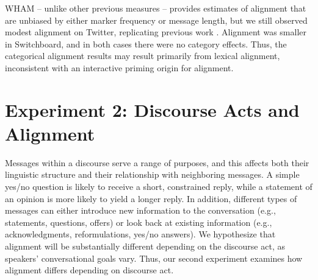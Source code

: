 \documentclass[11pt]{article}
\begin{document}
WHAM -- unlike other previous measures -- provides estimates of alignment that are unbiased by either marker frequency or message length, but we still observed modest alignment on Twitter, replicating previous work \cite{DoyleYurovskyFrank2016,DNMGamonDumais2011}. Alignment was smaller in Switchboard, and in both cases there were no category effects. Thus, the categorical alignment results may result primarily from lexical alignment, inconsistent with an interactive priming origin for alignment.



\section{Experiment 2: Discourse Acts and Alignment}

Messages within a discourse serve a range of purposes, and this affects both their linguistic structure and their relationship with neighboring messages.  A simple yes/no question is likely to receive a short, constrained reply, while a statement of an opinion is more likely to yield a longer reply. In addition, different types of messages can either introduce new information to the conversation (e.g., statements, questions, offers) or look back at existing information (e.g., acknowledgments, reformulations, yes/no answers). We hypothesize that alignment will be substantially different depending on the discourse act, as speakers' conversational goals vary. Thus, our second experiment examines how alignment differs depending on discourse act.
\end{document}
